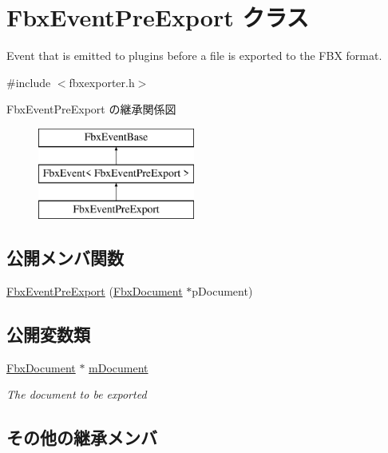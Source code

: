 \hypertarget{class_fbx_event_pre_export}{}\section{Fbx\+Event\+Pre\+Export クラス}
\label{class_fbx_event_pre_export}


Event that is emitted to plugins before a file is exported to the F\+BX format.  




{\ttfamily \#include $<$fbxexporter.\+h$>$}

Fbx\+Event\+Pre\+Export の継承関係図\begin{figure}[H]
\begin{center}
\leavevmode
\includegraphics[height=3.000000cm]{class_fbx_event_pre_export}
\end{center}
\end{figure}
\subsection*{公開メンバ関数}
\begin{DoxyCompactItemize}
\item 
\hyperlink{class_fbx_event_pre_export_a90642ec2d709d7bbb898df8248f848ba}{Fbx\+Event\+Pre\+Export} (\hyperlink{class_fbx_document}{Fbx\+Document} $\ast$p\+Document)
\end{DoxyCompactItemize}
\subsection*{公開変数類}
\begin{DoxyCompactItemize}
\item 
\hyperlink{class_fbx_document}{Fbx\+Document} $\ast$ \hyperlink{class_fbx_event_pre_export_aee74a30348fc851b3690a90c99b0a4b8}{m\+Document}
\begin{DoxyCompactList}\small\item\em The document to be exported \end{DoxyCompactList}\end{DoxyCompactItemize}
\subsection*{その他の継承メンバ}



